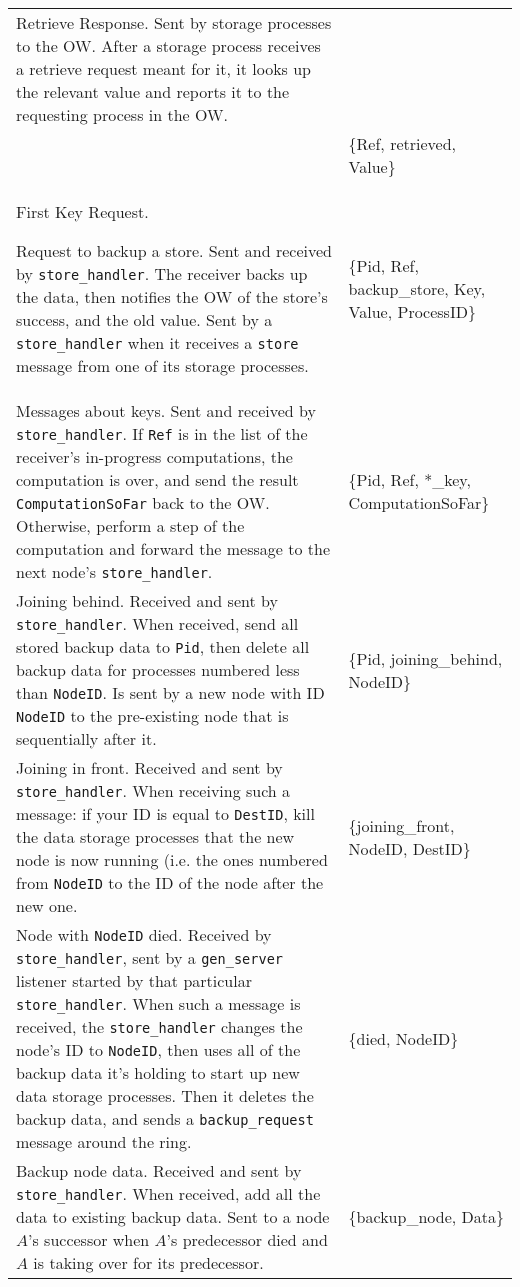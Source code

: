 \documentclass[12pt,letterpaper]{article}
\renewcommand{\tt}[1]{\texttt{#1}}
\newcommand{\sh}{\tt{store\_handler}}
\newcommand{\gs}{\tt{gen\_server}}
\begin{document}
\begin{longtable}{p{4.5in}T}
Retrieve Response. Sent by storage processes to the OW. After a storage process receives a retrieve request meant for it, it looks up the relevant value and reports it to the requesting process in the OW. \\
& \{Ref, retrieved, Value\} \\

First Key Request. 

Request to backup a store.  Sent and received by \sh.  The receiver backs up the data, then notifies the OW of the store's success, and the old value.  Sent by a \sh{} when it receives a \tt{store} message from one of its storage processes. & \{Pid, Ref, backup\_store, Key, Value, ProcessID\} \\

Messages about keys.  Sent and received by \sh.  If \tt{Ref} is in the list of the receiver's in-progress computations, the computation is over, and send the result \tt{ComputationSoFar} back to the OW.  Otherwise, perform a step of the computation and forward the message to the next node's \sh.  & \{Pid, Ref, *\_key, ComputationSoFar\} \\

Joining behind. Received and sent by \sh.  When received, send all stored backup data to \tt{Pid}, then delete all backup data for processes numbered less than \tt{NodeID}.  Is sent by a new node with ID \tt{NodeID} to the pre-existing node that is sequentially after it. & \{Pid, joining\_behind, NodeID\} \\

Joining in front.  Received and sent by \sh.  When receiving such a message: if your ID is equal to \tt{DestID}, kill the data storage processes that the new node is now running (i.e. the ones numbered from \tt{NodeID} to the ID of the node after the new one. & \{joining\_front, NodeID, DestID\} \\

Node with \tt{NodeID} died.  Received by \sh, sent by a \gs{} listener started by that particular \sh.  When such a message is received, the \sh{} changes the node's ID to \tt{NodeID}, then uses all of the backup data it's holding to start up new data storage processes.  Then it deletes the backup data, and sends a \tt{backup\_request} message around the ring. & \{died, NodeID\} \\

Backup node data.  Received and sent by \sh.  When received, add all the data to existing backup data.  Sent to a node $A$'s successor when $A$'s predecessor died and $A$ is taking over for its predecessor.  & \{backup\_node, Data\} \\


\end{longtable}
\end{document}
